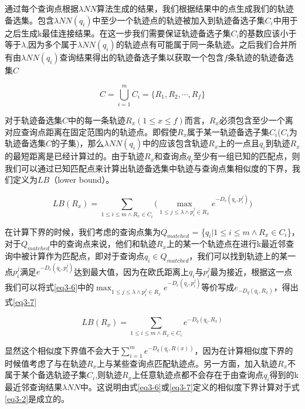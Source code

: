 通过每个查询点根据$\lambda NN$算法生成的结果，我们根据结果中的点生成我们的轨迹备选集。包含$\lambda NN(q_{i})$中至少一个轨迹点的轨迹被加入到轨迹备选子集$C_{i}$中用于之后生成k最佳连接结果。在这一步我们需要保证轨迹备选子集$C_{i}$的基数应该小于等于$\lambda$,因为多个属于$\lambda NN(q_{i})$的轨迹点有可能属于同一条轨迹。之后我们合并所有由$\lambda NN(q_{i})$查询结果得出的轨迹备选子集以获取一个包含$f$条轨迹的轨迹备选集$C$

\begin{equation} 
 C = \bigcup_{i=1}^{m} C_{i} = \{R_{1}, R_{2}, \cdots, R_{f}\} \nonumber
\end{equation}  

对于轨迹备选集$C$中的每一条轨迹$R_{x} (1 \leq x \leq f)$而言，$R_{x}$必须包含至少一个离对应查询点距离在固定范围内的轨迹点。即假使$R_{x}$属于某一轨迹备选子集$C_{i}$($C_{i}$为轨迹备选集$C$的子集)，那么$\lambda NN(q_{i})$中的应该包含轨迹$R_{x}$上的一点且$q_{i}$到轨迹$R_{x}$的最短距离是已经计算过的。由于轨迹$R_{x}$和查询点$q_{i}$至少有一组已知的匹配点，则我们可以通过已知匹配点来计算出轨迹备选集中轨迹与查询点集相似度的下界，我们定义为$LB$（lower bound）。

\begin{equation}
	\label{eq3-6}
	LB(R_{x}) = \sum_{1\leq i\leq m \wedge R_{x}\in C_{i}}\bigg( \max_{1\leq j\leq \lambda \wedge p_{i}^{j}\in R_{x}}e^{-D_{e}(q_{i}, p_{i}^{j})}\bigg)
\end{equation}


在计算下界的时候，我们考虑的查询点集为$Q_{matched}$ = \{$q_{i} | 1\leq i\leq m \wedge R_{x} \in C_{i}$\}，对于$Q_{matched}$中的查询点来说，他们和轨迹$R_{x}$上的某一个轨迹点在进行k最近邻查询中被计算作为匹配点，即对于查询点$q_{i} \in Q_{matched}$，我们可以找到轨迹上的某一点$p_{i}^{j}$满足$e^{-D_{e}(q_{i}, p_{i}^{j})}$达到最大值，因为在欧氏距离上$q_{i}$与$p_{i}^{j}$最为接近，根据这一点我们可以将式\ref{eq3-6}中的$\max_{1\leq j\leq \lambda \wedge p_{i}^{j}\in R_{x}}e^{-D_{e}(q_{i}, p_{i}^{j})}$等价写成$e_{-D_{q}(q_{i}, R_{x})}$，得出式\ref{eq3-7}

\begin{equation}
	\label{eq3-7}
	LB(R_{x}) = \sum_{1\leq i\leq m \wedge R_{x}\in C_{i}}e^{-D_{q}(q_{i}, R_{x})}
\end{equation} 

显然这个相似度下界值不会大于$\sum_{i=1}^{m} e^{-D_{q}(q_{i}, R(x))}$，因为在计算相似度下界的时候值考虑了与在轨迹$R_{x}$上与某些查询点匹配轨迹点。另一方面，加入轨迹$R_{x}$不属于某个备选轨迹子集$C_{i}$,则轨迹$R_{x}$上任意轨迹点都不会存在于由查询点$q_{i}$得到的k最近邻查询结果$\lambda NN$中。这说明由式\ref{eq3-6}或\ref{eq3-7}定义的相似度下界计算对于式\ref{eq3-2}是成立的。

